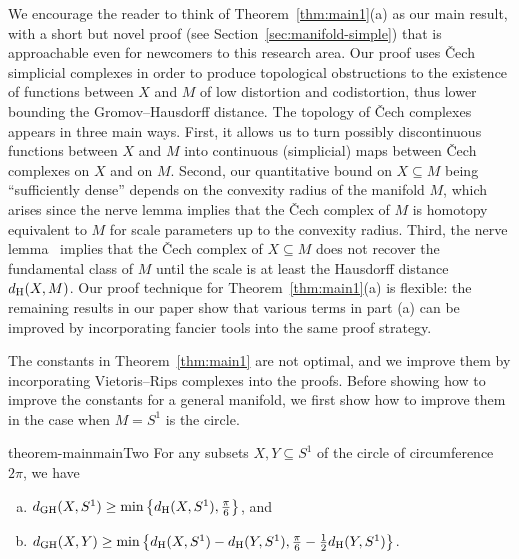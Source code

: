 \documentclass[11pt, reqno, english]{amsart}
\begin{document}

We encourage the reader to think of Theorem~\ref{thm:main1}(a) as our main result, with a short but novel proof (see Section~\ref{sec:manifold-simple}) that is approachable even for newcomers to this research area.
Our proof uses \v{C}ech simplicial complexes in order to produce topological obstructions to the existence of functions between $X$ and $M$ of low distortion and codistortion, thus lower bounding the Gromov--Hausdorff distance.
The topology of \v{C}ech complexes appears in three main ways.
First, it allows us to turn possibly discontinuous functions between $X$ and $M$ into continuous (simplicial) maps between \v{C}ech complexes on $X$ and on $M$.
Second, our quantitative bound on $X\subseteq M$ being ``sufficiently dense'' depends on the convexity radius of the manifold $M$, which arises since the nerve lemma implies that the \v{C}ech complex of $M$ is homotopy equivalent to $M$ for scale parameters up to the convexity radius.
Third, the nerve lemma~\cite{Alexandroff1928,Borsuk1948} implies that the \v{C}ech complex of $X\subseteq M$ does not recover the fundamental class of $M$ until the scale is at least the Hausdorff distance $d_{\mathrm{H}}(X,M)$.
Our proof technique for Theorem~\ref{thm:main1}(a) is flexible: the remaining results in our paper show that various terms in part (a) can be improved by incorporating fancier tools into the same proof strategy.

The constants in Theorem~\ref{thm:main1} are not optimal, and we improve them by incorporating Vietoris--Rips complexes into the proofs.
Before showing how to improve the constants for a general manifold, we first show how to improve them in the case when $M=S^1$ is the circle.

\vspace{3mm}
\begin{restatable}{theorem-main}{mainTwo}
\label{thm:main2}    
For any subsets $X,Y\subseteq S^1$ of the circle of circumference $2\pi$, we have
\begin{enumerate}[(a)]
\item $d_{\mathrm{GH}}(X,S^1)\geq\min\left\{d_{\mathrm{H}}(X,S^1),\tfrac{\pi}{6}\right\}$, and
\item $d_{\mathrm{GH}}(X,Y)\geq\min\left\{d_{\mathrm{H}}(X,S^1)-d_{\mathrm{H}}(Y,S^1),\tfrac{\pi}{6}-\tfrac{1}{2}d_{\mathrm{H}}(Y,S^1)\right\}$.
\end{enumerate}
\end{restatable}
\vspace{3mm}
\end{document}
